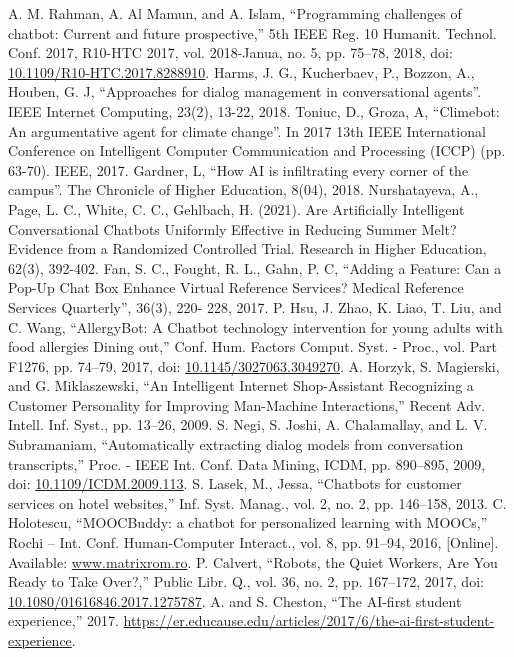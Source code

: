 \documentclass[conference]{IEEEtran}
\begin{document}
\begin{thebibliography}{00}
 A. M. Rahman, A. Al Mamun, and A. Islam, “Programming challenges of chatbot: Current and future prospective,” 5th IEEE Reg. 10 Humanit. Technol. Conf. 2017, R10-HTC 2017, vol. 2018-Janua, no. 5, pp. 75–78, 2018, doi: \url{10.1109/R10-HTC.2017.8288910}.
Harms, J. G., Kucherbaev, P., Bozzon, A., Houben, G. J, “Approaches for dialog management in conversational agents”. IEEE Internet Computing, 23(2), 13-22, 2018.
Toniuc, D., Groza, A, “Climebot: An argumentative agent for climate change”. In 2017 13th IEEE International Conference on Intelligent Computer Communication and Processing (ICCP) (pp. 63-70). IEEE, 2017.
Gardner, L, “How AI is infiltrating every corner of the campus”. The Chronicle of Higher Education, 8(04), 2018.
Nurshatayeva, A., Page, L. C., White, C. C., Gehlbach, H. (2021). Are Artificially Intelligent Conversational Chatbots Uniformly Effective in Reducing Summer Melt? Evidence from a Randomized Controlled Trial. Research in Higher Education, 62(3), 392-402.
Fan, S. C., Fought, R. L., Gahn, P. C, “Adding a Feature: Can a Pop-Up Chat Box Enhance Virtual Reference Services? Medical Reference Services Quarterly”,  36(3), 220- 228, 2017.
P. Hsu, J. Zhao, K. Liao, T. Liu, and C. Wang, “AllergyBot: A Chatbot technology intervention for young adults with food allergies Dining out,” Conf. Hum. Factors Comput. Syst. - Proc., vol. Part F1276, pp. 74–79, 2017, doi: \url{10.1145/3027063.3049270}.
A. Horzyk, S. Magierski, and G. Miklaszewski, “An Intelligent Internet Shop-Assistant Recognizing a Customer Personality for Improving Man-Machine Interactions,” Recent Adv. Intell. Inf. Syst., pp. 13–26, 2009.
S. Negi, S. Joshi, A. Chalamallay, and L. V. Subramaniam, “Automatically extracting dialog models from conversation transcripts,” Proc. - IEEE Int. Conf. Data Mining, ICDM, pp. 890–895, 2009, doi: \url{10.1109/ICDM.2009.113}.
S. Lasek, M., Jessa, “Chatbots for customer services on hotel websites,” Inf. Syst. Manag., vol. 2, no. 2, pp. 146–158, 2013.
C. Holotescu, “MOOCBuddy: a chatbot for personalized learning with MOOCs,” Rochi – Int. Conf. Human-Computer Interact., vol. 8, pp. 91–94, 2016, [Online]. Available: \url{www.matrixrom.ro}.
P. Calvert, “Robots, the Quiet Workers, Are You Ready to Take Over?,” Public Libr. Q., vol. 36, no. 2, pp. 167–172, 2017, doi: \url{10.1080/01616846.2017.1275787}.
A. and S. Cheston, “The AI-first student experience,” 2017. \url{https://er.educause.edu/articles/2017/6/the-ai-first-student-experience}.

\end{thebibliography}
\end{document}
